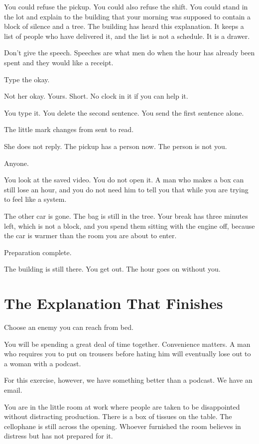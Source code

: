 \documentclass[11pt,oneside]{book}
\begin{document}
You could refuse the pickup. You could also refuse the shift. You could stand in the lot and explain to the building that your morning was supposed to contain a block of silence and a tree. The building has heard this explanation. It keeps a list of people who have delivered it, and the list is not a schedule. It is a drawer.

Don't give the speech. Speeches are what men do when the hour has already been spent and they would like a receipt.

Type the okay.

Not her okay. Yours. Short. No clock in it if you can help it.

You type it. You delete the second sentence. You send the first sentence alone.

The little mark changes from sent to read.

She does not reply. The pickup has a person now. The person is not you.

Anyone.

You look at the saved video. You do not open it. A man who makes a box can still lose an hour, and you do not need him to tell you that while you are trying to feel like a system.

The other car is gone. The bag is still in the tree. Your break has three minutes left, which is not a block, and you spend them sitting with the engine off, because the car is warmer than the room you are about to enter.

Preparation complete.

The building is still there. You get out. The hour goes on without you.

\chapter*{The Explanation That Finishes}

Choose an enemy you can reach from bed.

You will be spending a great deal of time together. Convenience matters. A man who requires you to put on trousers before hating him will eventually lose out to a woman with a podcast.

For this exercise, however, we have something better than a podcast. We have an email.

You are in the little room at work where people are taken to be disappointed without distracting production. There is a box of tissues on the table. The cellophane is still across the opening. Whoever furnished the room believes in distress but has not prepared for it.
\end{document}
